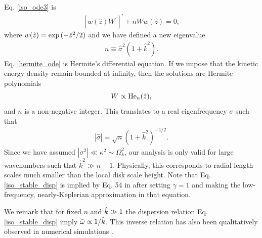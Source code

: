Eq. \ref{iso_ode3} is
\begin{align}\label{hermite_ode}
  \left[w(\hat{z})W^\prime \right]^\prime + nW
  w(\hat{z}) =0, 
\end{align}
where $w(\hat{z})=\exp{(-\hat{z}^2/2)}$ and we have defined a new eigenvalue 
\begin{align}
  n \equiv \hat{\sigma}^2(1+\hat{k}^2). 
\end{align} 
Eq. \ref{hermite_ode} is Hermite's differential equation. If we impose
that the kinetic energy density remain bounded at infinity, then the
solutions are Hermite polynomials  
\begin{align}
  W \propto \operatorname{He}_n(\hat{z}),
\end{align}
and $n$ is a non-negative integer. This translates to a real
eigenfrequency $\sigma$ such that
\begin{align}
  \left|\hat{\sigma}\right| = \sqrt{n}
  \left(1+\hat{k}^2\right)^{-1/2}. \label{iso_stable_disp}
\end{align}
Since we have assumed $|\sigma^2|\ll \kappa^2\sim \Omega_k^2$, our
analysis is only valid for large wavenumbers such that $\hat{k}^2\gg   
n-1$. Physically, this corresponds to radial length-scales much
smaller than the local disk scale height. Note that
Eq. \ref{iso_stable_disp} is implied by Eq. 54 in
\cite{lubow93} after setting $\gamma=1$ and making the low-frequency,
nearly-Keplerian approximation in that equation. 

We remark that for fixed $n$ and $\hat{k}\gg 1$ the dispersion relation 
Eq. \ref{iso_stable_disp} imply $\hat{\omega}\propto 1/\hat{k}$. This inverse relation 
has also been qualitatively observed in numerical simulations
\citep{stoll14}.  


